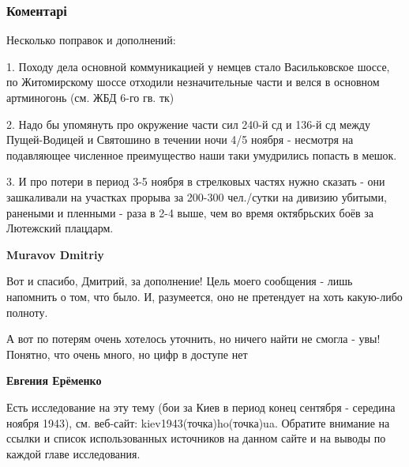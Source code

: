  
 
 
 
 
\subsubsection{Коментарі}

\begin{itemize} %

Несколько поправок и дополнений:

1. Походу дела основной коммуникацией у немцев стало Васильковское шоссе, по
Житомирскому шоссе отходили незначительные части и велся в основном артминогонь
(см. ЖБД 6-го гв. тк)

2. Надо бы упомянуть про окружение части сил 240-й сд и 136-й сд между
Пущей-Водицей и Святошино в течении ночи 4/5 ноября - несмотря на подавляющее
численное преимущество наши таки умудрились попасть в мешок.

3. И про потери в период 3-5 ноября в стрелковых частях нужно сказать - они
зашкаливали на участках прорыва за 200-300 чел./сутки на дивизию убитыми,
ранеными и пленными - раза в 2-4 выше, чем во время октябрьских боёв за
Лютежский плацдарм.

\begin{itemize} %
\textbf{Muravov Dmitriy} 

Вот и спасибо, Дмитрий, за дополнение! Цель моего сообщения - лишь напомнить о
том, что было. И, разумеется, оно не претендует на хоть какую-либо полноту.

А вот по потерям очень хотелось уточнить, но ничего найти не смогла - увы!
Понятно, что очень много, но цифр в доступе нет

\begin{itemize} %
\textbf{Евгения Ерёменко} 

Есть исследование на эту тему (бои за Киев в период конец сентября - середина
ноября 1943), см. веб-сайт: kiev1943(точка)ho(точка)ua. Обратите внимание на
ссылки и список использованных источников на данном сайте и на выводы по каждой
главе исследования.


\end{itemize}
\end{itemize}
\end{itemize}
